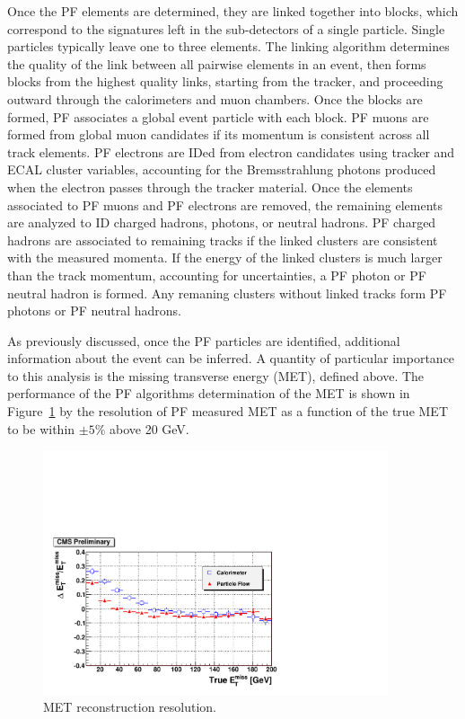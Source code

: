 \indent Once the PF elements are determined, they are linked together into blocks, which correspond to the signatures left in the sub-detectors of a single particle. Single particles typically leave one to three elements. The linking algorithm determines the quality of the link between all pairwise elements in an event, then forms blocks from the highest quality links, starting from the tracker, and proceeding outward through the calorimeters and muon chambers. Once the blocks are formed, PF associates a global event particle with each block. PF muons are formed from global muon candidates if its momentum is consistent across all track elements. PF electrons are IDed from electron candidates using tracker and ECAL cluster variables, accounting for the Bremsstrahlung photons produced when the electron passes through the tracker material. Once the elements associated to PF muons and PF electrons are removed, the remaining elements are analyzed to ID charged hadrons, photons, or neutral hadrons. PF charged hadrons are associated to remaining tracks if the linked clusters are consistent with the measured momenta. If the energy of the linked clusters is much larger than the track momentum, accounting for uncertainties, a PF photon or PF neutral hadron is formed. Any remaning clusters without linked tracks form PF photons or PF neutral hadrons. 

\indent As previously discussed, once the PF particles are identified, additional information about the event can be inferred. A quantity of particular importance to this analysis is the missing transverse energy (MET), defined above. The performance of the PF algorithms determination of the MET is shown in Figure~\ref{fig:pfmetres} by the resolution of PF measured MET as a function of the true MET to be within $\pm5\%$ above 20 GeV.


\begin{figure}[tbh]
\centering
\includegraphics[width=4in]{figures/pfmetres.pdf}
\caption{MET reconstruction resolution.}
\label{fig:pfmetres}
\end{figure}


